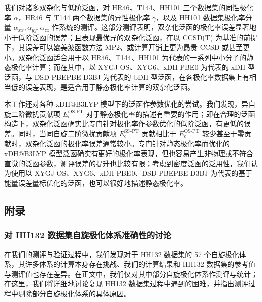 我们对诸多双杂化与低阶泛函，对 HR46、T144、HH101 三个数据集的同性极化率 $\alpha$，HR46 与 T144 两个数据集的异性极化率 $\gamma$，以及 HH101 数据集极化率分量 $\alpha_{xx}, \alpha_{yy}, \alpha_{zz}$ 作系统的测评。这部分测评表明，双杂化泛函的极化率误差显著地小于低阶泛函的误差；且表现最优异的双杂化泛函，在以 CCSD(T) 为基准的前提下，其误差可以媲美波函数方法 MP2、或计算开销上更为昂贵 CCSD 或甚至更小。双杂化泛函适合用于以 HR46、T144、HH101 为代表的一系列中小分子的静态极化率计算；而在其中，以 XYGJ-OS、XYG6、xDH-PBE0 为代表的 xDH 型泛函，与 DSD-PBEPBE-D3BJ 为代表的 bDH 型泛函，在各极化率数据集上有相当低的误差表现，是适合用于静态极化率计算的双杂化泛函。

本工作还对各种 xDH@B3LYP 模型下的泛函作参数优化的尝试。我们发现，异自旋二阶微扰贡献项 $E_\mathrm{c}^\text{OS-PT}$ 对于静态极化率的描述有重要的作用；即在合理的泛函构造下，双杂化泛函确实比专门针对极化率作参数优化的低阶泛函，有更低的误差。同时，当同自旋二阶微扰贡献项 $E_\mathrm{c}^\text{SS-PT}$ 贡献相比于 $E_\mathrm{c}^\text{OS-PT}$ 较少甚至于零贡献时，双杂化泛函的极化率误差通常较小。专门针对静态极化率而优化的 xDH@B3LYP 模型泛函确实有更好的极化率表现，但也容易产生非物理或不符合直觉的泛函参数，测评误差的提升也比较有限；考虑到密度泛函的泛用性，我们认为使用以 XYGJ-OS、XYG6、xDH-PBE0、DSD-PBEPBE-D3BJ 为代表的基于能量误差量标优化的泛函，也可以很好地描述静态极化率。

\newpage

\subsection{附录}

\subsubsection{对 HH132 数据集自旋极化体系准确性的讨论}
\label{sec.6.supp-HH132-remove}

在我们的测评与验证过程中，我们发现对于 \alert{HH132} 数据集\cite{Hait-Head-Gordon.PCCP.2018}的 57 个自旋极化体系，其许多体系的计算本身存在挑战、我们的计算结果和 HH132 数据集的参考值与测评值也存在差异。在正文中，我们仅对其中部分自旋极化体系作测评与统计；在这里，我们将详细地讨论复现 HH132 数据集过程中遇到的困难，并指出测评过程中剔除部分自旋极化体系的具体原因。

